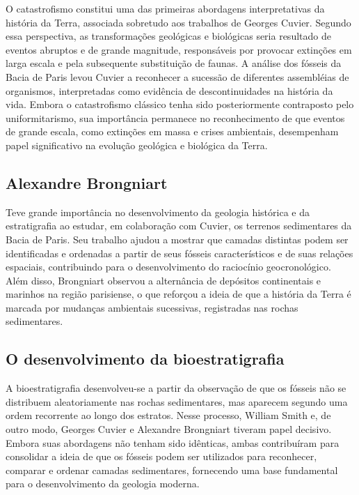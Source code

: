 \documentclass[a4paper,12pt]{article}
\theoremstyle{definition}
\theoremstyle{definition}
\theoremstyle{definition}
\begin{document}
O catastrofismo constitui uma das primeiras abordagens interpretativas da história da Terra, associada sobretudo aos trabalhos de Georges Cuvier. Segundo essa perspectiva, as transformações geológicas e biológicas seria resultado de eventos abruptos e de grande magnitude, responsáveis por provocar extinções em larga escala e pela subsequente substituição de faunas. A análise dos fósseis da Bacia de Paris levou Cuvier a reconhecer a sucessão de diferentes assembléias de organismos, interpretadas como evidência de descontinuidades na história da vida. Embora o catastrofismo clássico tenha sido posteriormente contraposto pelo uniformitarismo, sua importância permanece no reconhecimento de que eventos de grande escala, como extinções em massa e crises ambientais, desempenham papel significativo na evolução geológica e biológica da Terra.

\subsection{Alexandre Brongniart} 
Teve grande importância no desenvolvimento da geologia histórica e da estratigrafia ao estudar, em colaboração com Cuvier, os terrenos sedimentares da Bacia de Paris. Seu trabalho ajudou a mostrar que camadas distintas podem ser identificadas e ordenadas a partir de seus fósseis característicos e de suas relações espaciais, contribuindo para o desenvolvimento do raciocínio geocronológico. Além disso, Brongniart observou a alternância de depósitos continentais e marinhos na região parisiense, o que reforçou a ideia de que a história da Terra é marcada por mudanças ambientais sucessivas, registradas nas rochas sedimentares.

\subsection{O desenvolvimento da bioestratigrafia}

A bioestratigrafia desenvolveu-se a partir da observação de que os fósseis não se distribuem aleatoriamente nas rochas sedimentares, mas aparecem segundo uma ordem recorrente ao longo dos estratos. Nesse processo, William Smith e, de outro modo, Georges Cuvier e Alexandre Brongniart tiveram papel decisivo. Embora suas abordagens não tenham sido idênticas, ambas contribuíram para consolidar a ideia de que os fósseis podem ser utilizados para reconhecer, comparar e ordenar camadas sedimentares, fornecendo uma base fundamental para o desenvolvimento da geologia moderna.
\end{document}
